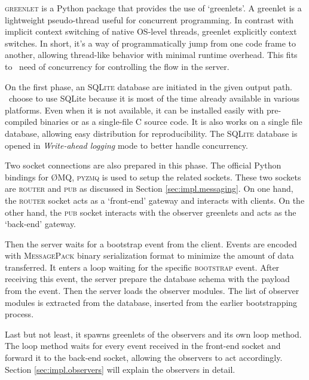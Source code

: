 \textsc{greenlet} is a Python package that provides the use of `greenlets'.
A greenlet is a lightweight pseudo-thread useful for concurrent programming.
In contrast with implicit context switching of native OS-level threads, greenlet explicitly context switches.
In short, it's a way of programmatically jump from one code frame to another, allowing thread-like behavior with minimal runtime overhead.
This fits to \firstposs~need of concurrency for controlling the flow in the server.

On the first phase, an \textsc{SQLite} database are initiated in the given output path.
\First~choose to use SQLite because it is most of the time already available in various platforms.
Even when it is not available, it can be installed easily with pre-compiled binaries or as a single-file C source code.
It is also works on a single file database, allowing easy distribution for reproducibility.
The \textsc{SQLite} database is opened in \emph{Write-ahead logging} mode to better handle concurrency.

Two socket connections are also prepared in this phase.
The official Python bindings for \O MQ, \textsc{pyzmq} is used to setup the related sockets.
These two sockets are \textsc{router} and \textsc{pub} as discussed in Section \ref{sec:impl.messaging}.
On one hand, the \textsc{router} socket acts as a `front-end' gateway and interacts with clients.
On the other hand, the \textsc{pub} socket interacts with the observer greenlets and acts as the `back-end' gateway.

Then the server waits for a bootstrap event from the client.
Events are encoded with \textsc{MessagePack} binary serialization format to minimize the amount of data transferred.
It enters a loop waiting for the specific \textsc{bootstrap} event.
After receiving this event, the server prepare the database schema with the payload from the event.
Then the server loads the observer modules.
The list of observer modules is extracted from the database, inserted from the earlier bootstrapping process.

Last but not least, it spawns greenlets of the observers and its own loop method.
The loop method waits for every event received in the front-end socket and forward it to the back-end socket, allowing the observers to act accordingly.
Section \ref{sec:impl.observers} will explain the observers in detail.



